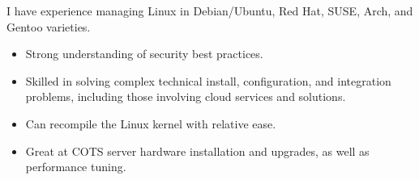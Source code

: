 \documentclass[a4paper,10pt]{article} %
\begin{document}
  I have experience managing Linux in Debian/Ubuntu, Red Hat, SUSE, Arch, and
  Gentoo varieties.
  \begin{itemize}
  \item Strong understanding of security best practices.
  \item Skilled in solving complex  technical install, configuration, and
        integration problems, including those involving cloud services and
        solutions.
  \item Can recompile the Linux kernel with relative ease.
  \item Great at COTS server hardware installation and upgrades, as well as performance tuning.
  \end{itemize}
\Sep




 \\
 \\
 \\



\end{document}

